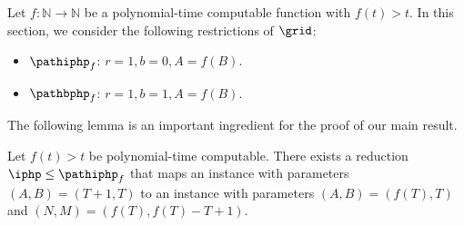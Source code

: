 Let $f\colon \mathbb{N} \to \mathbb{N}$ be a polynomial-time computable function with $f(t) > t$. In this section, we consider the following restrictions of $\grid$:

\begin{itemize}
    \item $\pathiphp_f$: $r=1, b=0, A = f(B)$.
    \item $\pathbphp_f$: $r=1, b=1, A = f(B)$.
\end{itemize}

The following lemma is an important ingredient for the proof of our main result.


\begin{lemma}\label{lem:inj-path-php}
Let $f(t)>t$ be polynomial-time computable.
There exists a reduction $\iphp\leq \pathiphp_f$ that maps an instance with parameters $(A,B) = (T+1,T)$ to an instance with parameters $(A,B) = (f(T),T)$ and $(N,M) = (f(T),f(T)-T+1)$.
\end{lemma}



